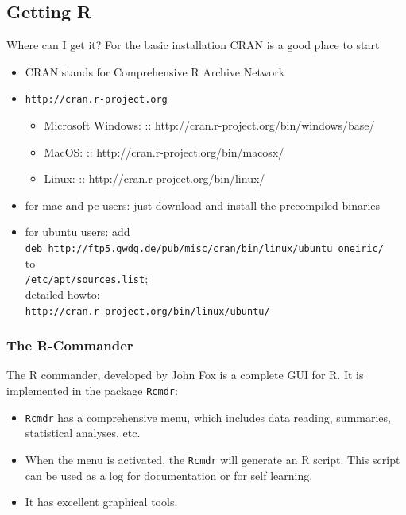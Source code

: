 \documentclass[xcolor={table},c]{beamer}
\begin{document}
\subsection{Getting R}
\begin{frame}[shrink=8,squeeze]{Where can I get it?}
  For the basic installation CRAN is a good place to start 
  \begin{itemize}
    \item CRAN stands for Comprehensive R Archive Network 
    \item \texttt{http://cran.r-project.org}\\ 
      \begin{itemize}
        \item Microsoft Windows: :: http://cran.r-project.org/bin/windows/base/\\
        \item  MacOS: :: http://cran.r-project.org/bin/macosx/\\
        \item  Linux: :: http://cran.r-project.org/bin/linux/\\ 
      \end{itemize}
    \item for mac and pc users: just download and install the precompiled binaries
    \item for ubuntu users: add \\ 
   \texttt{deb http://ftp5.gwdg.de/pub/misc/cran/bin/linux/ubuntu oneiric/} \\
to \\ \texttt{/etc/apt/sources.list}; \\ detailed howto: \\ \texttt{http://cran.r-project.org/bin/linux/ubuntu/} 
    \end{itemize}
\end{frame}

\begin{frame}\frametitle{The R-Commander}
The R commander, developed by John Fox is a complete GUI for R. It is implemented in the package \texttt{Rcmdr}:
\begin{itemize}
\item \texttt{Rcmdr} has a comprehensive menu, which includes data reading, summaries, statistical analyses, etc.
\item When the menu is activated, the \texttt{Rcmdr} will generate an R script. This script can be used as a log for documentation or for self learning.
\item It has excellent graphical tools.
\end{itemize}
\end{frame}
\end{document}
